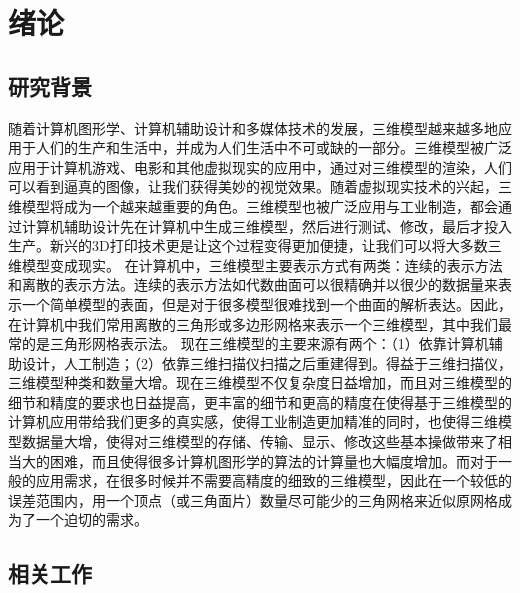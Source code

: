 

\chapter{绪论}

\section{研究背景}
随着计算机图形学、计算机辅助设计和多媒体技术的发展，三维模型越来越多地应用于人们的生产和生活中，并成为人们生活中不可或缺的一部分。三维模型被广泛应用于计算机游戏、电影和其他虚拟现实的应用中，通过对三维模型的渲染，人们可以看到逼真的图像，让我们获得美妙的视觉效果。随着虚拟现实技术的兴起，三维模型将成为一个越来越重要的角色。三维模型也被广泛应用与工业制造，都会通过计算机辅助设计先在计算机中生成三维模型，然后进行测试、修改，最后才投入生产。新兴的3D打印技术更是让这个过程变得更加便捷，让我们可以将大多数三维模型变成现实。
在计算机中，三维模型主要表示方式有两类：连续的表示方法和离散的表示方法。连续的表示方法如代数曲面可以很精确并以很少的数据量来表示一个简单模型的表面，但是对于很多模型很难找到一个曲面的解析表达。因此，在计算机中我们常用离散的三角形或多边形网格来表示一个三维模型，其中我们最常的是三角形网格表示法。
现在三维模型的主要来源有两个：（1）依靠计算机辅助设计，人工制造；（2）依靠三维扫描仪扫描之后重建得到。得益于三维扫描仪，三维模型种类和数量大增。现在三维模型不仅复杂度日益增加，而且对三维模型的细节和精度的要求也日益提高，更丰富的细节和更高的精度在使得基于三维模型的计算机应用带给我们更多的真实感，使得工业制造更加精准的同时，也使得三维模型数据量大增，使得对三维模型的存储、传输、显示、修改这些基本操做带来了相当大的困难，而且使得很多计算机图形学的算法的计算量也大幅度增加。而对于一般的应用需求，在很多时候并不需要高精度的细致的三维模型，因此在一个较低的误差范围内，用一个顶点（或三角面片）数量尽可能少的三角网格来近似原网格成为了一个迫切的需求。


\section{相关工作}

